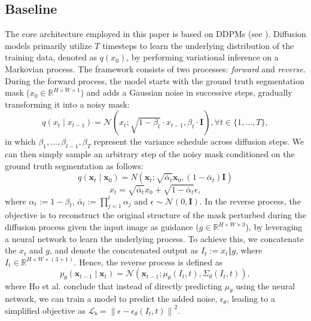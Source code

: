 \documentclass[runningheads]{llncs}
\begin{document}
\subsection{Baseline}
The core architecture employed in this paper is based on DDPMs \cite{ho2020denoising,wolleb2022diffusion} (see ). Diffusion models primarily utilize $T$ timesteps to learn the underlying distribution of the training data, denoted as $q(x_0)$, by performing variational inference on a Markovian process. The framework consists of two processes: \textit{forward} and \textit{reverse}. During the forward process, the model starts with the ground truth segmentation mask ($x_0 \in \mathbb{R}^{H\times W \times 1}$) and adds a Gaussian noise in successive steps, gradually transforming it into a noisy mask:
\begin{equation}
	q\left(x_t \mid x_{t-1}\right)=\mathcal{N}\left(x_t ; \sqrt{1-\beta_t} \cdot x_{t-1}, \beta_t \cdot \mathbf{I}\right), \forall t \in\{1, \ldots, T\},
\end{equation}
in which ${\beta}_1,\dots,{\beta}_{t-1},{\beta}_T$ represent the variance schedule across diffusion steps. We can then simply sample an arbitrary step of the noisy mask conditioned on the ground truth segmentation as follows:
\begin{equation}
	q\left(\mathbf{x}_t \mid \mathbf{x}_0\right)=N\left(\mathbf{x}_t ; \sqrt{\bar{\alpha}_t} \mathbf{x}_0,\left(1-\bar{\alpha}_t\right) \mathbf{I}\right)
\end{equation}
\begin{equation}
{{x}_{t}}=\sqrt{{{{\bar{\alpha }}}_{t}}}{{x}_{0}}+\sqrt{1-{{{\bar{\alpha }}}_{t}}}\epsilon,
\end{equation}
where ${{{\alpha }}_{t}}:=1-{{\beta }_{t}}$, ${{\bar{\alpha }}_{t}}:=\prod\nolimits_{j=1}^{t}{{{\alpha }_{j}}}$ and $\epsilon \sim \mathcal{N}(0,\textbf{I})$. In the reverse process, the objective is to reconstruct the original structure of the mask perturbed during the diffusion process given the input image as guidance ($g \in \mathbb{R}^{H\times W \times 3}$), by leveraging a neural network to learn the underlying process. To achieve this, we concatenate the $x_t$ and $g$, and denote the concatenated output as $I_t:=x_t \mathbin\Vert g $, where $I_t \in \mathbb{R}^{H\times W \times (3+1)}$. Hence, the reverse process is defined as 
\begin{equation}
	p_\theta\left(\mathbf{x}_{t-1} \mid \mathbf{x}_t\right)=\mathcal{N}\left(\mathbf{x}_{t-1} ; \mu_\theta\left(I_t, t\right), \Sigma_\theta\left(I_t, t\right)\right),
\end{equation} where Ho et al. \cite{ho2020denoising} conclude that instead of directly predicting $\mu_\theta$ using the neural network, we can train a model to predict the added noise, $\epsilon_\theta$, leading to a simplified objective as $\mathcal{L}_{b}=\left\|\epsilon-\epsilon_\theta\left(I_t, t\right)\right\|^2$.
\end{document}
